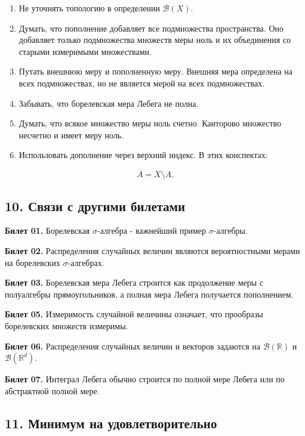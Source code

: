\documentclass[
  11pt,
  a4paper,
]{article}
\begin{document}
\begin{enumerate}
\def\labelenumi{\arabic{enumi}.}
\setcounter{enumi}{1}
\item
  Не уточнять топологию в определении \(\mathcal B(X)\).
\item
  Думать, что пополнение добавляет все подмножества пространства. Оно
  добавляет только подмножества множеств меры ноль и их объединения со
  старыми измеримыми множествами.
\item
  Путать внешнюю меру и пополненную меру. Внешняя мера определена на
  всех подмножествах, но не является мерой на всех подмножествах.
\item
  Забывать, что борелевская мера Лебега не полна.
\item
  Думать, что всякое множество меры ноль счетно. Канторово множество
  несчетно и имеет меру ноль.
\item
  Использовать дополнение через верхний индекс. В этих конспектах:
\end{enumerate}

\[
\overline{A}=X\setminus A.
\]

\subsection{10. Связи с другими
билетами}\label{ux441ux432ux44fux437ux438-ux441-ux434ux440ux443ux433ux438ux43cux438-ux431ux438ux43bux435ux442ux430ux43cux438}

\textbf{Билет 01.} Борелевская \(\sigma\)-алгебра - важнейший пример
\(\sigma\)-алгебры.

\textbf{Билет 02.} Распределения случайных величин являются
вероятностными мерами на борелевских \(\sigma\)-алгебрах.

\textbf{Билет 03.} Борелевская мера Лебега строится как продолжение меры
с полуалгебры прямоугольников, а полная мера Лебега получается
пополнением.

\textbf{Билет 05.} Измеримость случайной величины означает, что
прообразы борелевских множеств измеримы.

\textbf{Билет 06.} Распределения случайных величин и векторов задаются
на \(\mathcal B(\mathbb R)\) и \(\mathcal B(\mathbb R^d)\).

\textbf{Билет 07.} Интеграл Лебега обычно строится по полной мере Лебега
или по абстрактной полной мере.

\subsection{11. Минимум на
удовлетворительно}\label{ux43cux438ux43dux438ux43cux443ux43c-ux43dux430-ux443ux434ux43eux432ux43bux435ux442ux432ux43eux440ux438ux442ux435ux43bux44cux43dux43e}
\end{document}
